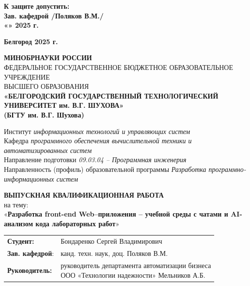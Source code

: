 \begin{titlepage}
   \vfill
    
    \centering
    \begin{minipage}{0.7\textwidth}
        \textbf{К защите допустить:\\
        Зав. кафедрой \underline{\hspace{4cm}} /Поляков В.М./\\
        «\underline{\hspace{1cm}}» \underline{\hspace{2cm}} 2025 г.}
    \end{minipage}
    
	\vfill
    
    \textbf{Белгород 2025 г.}
\end{titlepage}

\begin{titlepage}
    \centering
    {\small \textbf{МИНОБРНАУКИ РОССИИ}}\\
    {\small ФЕДЕРАЛЬНОЕ ГОСУДАРСТВЕННОЕ БЮДЖЕТНОЕ ОБРАЗОВАТЕЛЬНОЕ УЧРЕЖДЕНИЕ}\\
    {\small ВЫСШЕГО ОБРАЗОВАНИЯ}\\
    \textbf{
    «БЕЛГОРОДСКИЙ ГОСУДАРСТВЕННЫЙ ТЕХНОЛОГИЧЕСКИЙ \\
    УНИВЕРСИТЕТ им. В.Г. ШУХОВА» \\
    (БГТУ им. В.Г. Шухова) \\
    }
    
    \vfill %
    
    \raggedright
    Институт \textit{информационных технологий и управляющих систем}\\
    Кафедра \textit{программного обеспечения вычислительной техники и автоматизированных систем}\\
    Направление подготовки \textit{09.03.04 – Программная инженерия}\\
    Направленность (профиль) образовательной программы \textit{Разработка программно-информационных систем}
    
    \centering
    \vfill
    
    \textbf{ВЫПУСКНАЯ КВАЛИФИКАЦИОННАЯ РАБОТА}\\
    {\large на тему:\\[1ex]
    «\textbf{Разработка front-end Web–приложения – учебной среды с чатами и AI-анализом кода лабораторных работ}»}
    
    \vfill %
    
    \raggedright
    \begin{tabular}{@{} l l @{}}
        \textbf{Студент:}       & Бондаренко Сергей Владимирович \\
        \textbf{Зав. кафедрой}: & канд. техн. наук, доц. Поляков В.М. \\
        \textbf{Руководитель:}  & \parbox[t]{15cm}{руководитель департамента автоматизации бизнеса\\ ООО «Технологии надежности» Мельников А.Б.}
    \end{tabular}
    

\end{titlepage}
